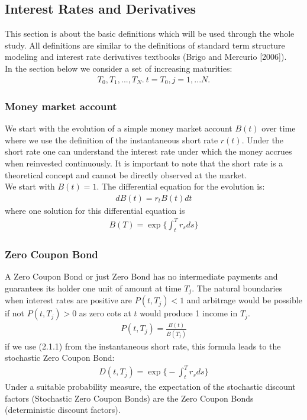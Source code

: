 \documentclass[11pt]{article}
\numberwithin{equation}{subsection}
\begin{document}
\subsection{Interest Rates and Derivatives}
This section is about the basic definitions which will be used through the whole study. All definitions are similar to the definitions of standard term structure modeling and interest rate derivatives textbooks (Brigo and Mercurio [2006]).\\
In the section below we consider a set of increasing maturities:
\begin{eqnarray*}
T_0, T_1,...,T_N. \  t=T_0, j=1,...N.
\end{eqnarray*}
\subsubsection{Money market account}
We start with the evolution of a simple money market account \(B(t)\) over time where we use the definition of the instantaneous short rate \(r(t)\). Under the short rate one can understand the interest rate under which the money accrues when reinvested continuously. It is important to note that the short rate is a theoretical concept and cannot be directly observed at the market.\\	
We start with \(B(t)=1\). The differential equation for the evolution is:
\begin{eqnarray*}
	dB(t) = r_{t}B(t)dt
\end{eqnarray*}	
where one solution for this differential equation is
\begin{eqnarray}
B(T) = \exp\bigg\{\int_{t}^{T}r_s ds\bigg\}
\end{eqnarray}
%	
\subsubsection{Zero Coupon Bond}
A Zero Coupon Bond or just Zero Bond has no intermediate payments and guarantees its holder one unit of amount at time \(T_j\). The natural boundaries when interest rates are positive are \(P(t, T_j)<1\) and arbitrage would be possible if not \(P(t, T_j)>0\) as zero cots at \(t\) would produce 1 income in \(T_j\).
\begin{eqnarray}
	P(t, T_j) =  \frac{B(t)}{B(T_j)}
\end{eqnarray}	
if we use (2.1.1) from the instantaneous short rate, this formula leads to the stochastic Zero Coupon Bond:
\begin{eqnarray}
D(t, T_j) = \exp\bigg\{-\int_{t}^{T}r_s ds\bigg\}
\end{eqnarray}	
Under a suitable probability measure, the expectation of the stochastic discount factors (Stochastic Zero Coupon Bonds) are the Zero Coupon Bonds (deterministic discount factors).
\end{document}
